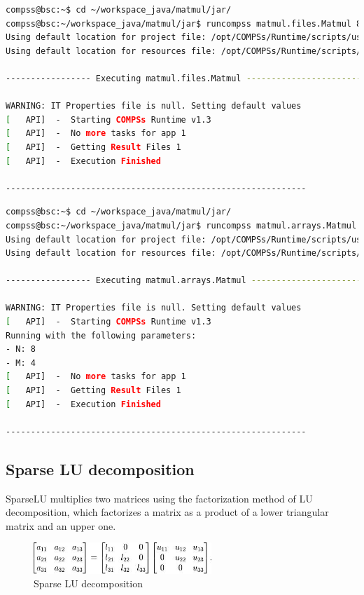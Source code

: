 \begin{lstlisting}[language=bash]
compss@bsc:~$ cd ~/workspace_java/matmul/jar/
compss@bsc:~/workspace_java/matmul/jar$ runcompss matmul.files.Matmul 8 4
Using default location for project file: /opt/COMPSs/Runtime/scripts/user/../../configuration/xml/projects/project.xml
Using default location for resources file: /opt/COMPSs/Runtime/scripts/user/../../configuration/xml/resources/resources.xml

----------------- Executing matmul.files.Matmul --------------------------

WARNING: IT Properties file is null. Setting default values
[   API]  -  Starting COMPSs Runtime v1.3
[   API]  -  No more tasks for app 1
[   API]  -  Getting Result Files 1
[   API]  -  Execution Finished

------------------------------------------------------------
\end{lstlisting}


\begin{lstlisting}[language=bash]
compss@bsc:~$ cd ~/workspace_java/matmul/jar/
compss@bsc:~/workspace_java/matmul/jar$ runcompss matmul.arrays.Matmul 8 4
Using default location for project file: /opt/COMPSs/Runtime/scripts/user/../../configuration/xml/projects/project.xml
Using default location for resources file: /opt/COMPSs/Runtime/scripts/user/../../configuration/xml/resources/resources.xml

----------------- Executing matmul.arrays.Matmul --------------------------

WARNING: IT Properties file is null. Setting default values
[   API]  -  Starting COMPSs Runtime v1.3
Running with the following parameters:
- N: 8
- M: 4
[   API]  -  No more tasks for app 1
[   API]  -  Getting Result Files 1
[   API]  -  Execution Finished

------------------------------------------------------------
\end{lstlisting}


\subsection{Sparse LU decomposition}
SparseLU multiplies two matrices using the factorization method of LU decomposition, which factorizes a 
matrix as a product of a lower triangular matrix and an upper one.

\begin{figure}[ht!]
  \centering
    \includegraphics[width=0.6\textwidth]{./Sections/2_Java/Figures/SparseLU.jpeg}
    \caption{Sparse LU decomposition}
    \label{fig:SparseLO}
\end{figure}

